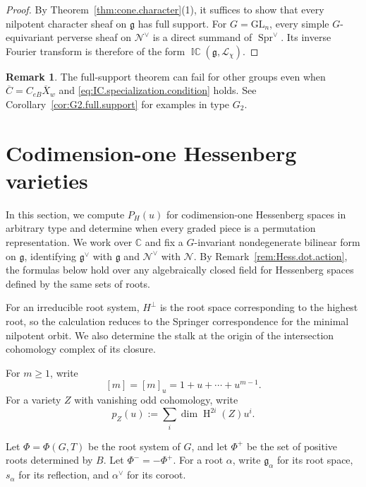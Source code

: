 \documentclass[11pt]{amsart}
\numberwithin{equation}{section}
\theoremstyle{definition}
\newtheorem{remark}[theorem]{Remark}
\DeclareMathOperator{\coh}{\mathrm{H}}
\DeclareMathOperator{\ICperv}{\mathbb{IC}}
\def\C{\mathbb{C}}
\def\fg{\mathfrak {g}}
\DeclareMathOperator{\Spr}{\mathrm{Spr}}
\begin{document}
\begin{proof}
By Theorem~\ref{thm:cone.character}(1), it suffices to show that every nilpotent character sheaf on $\fg$ has full support.
For $G=\mathrm{GL}_n$, every simple $G$-equivariant perverse sheaf on $\mathcal N^\vee$ is a direct summand of $\Spr^\vee$.
Its inverse Fourier transform is therefore of the form $\ICperv(\fg,\mathcal L_\chi)$.
\end{proof}

\begin{remark}
	The full-support theorem can fail for other groups even when $\overline C=C_{eB}\overline X_w$ and \eqref{eq:IC.specialization.condition} holds.
See Corollary~\ref{cor:G2.full.support} for examples in type $G_2$.
\end{remark}















\section{Codimension-one Hessenberg varieties}
\label{s:applications}\label{s:codim1}

In this section, we compute $P_H(u)$ for codimension-one Hessenberg spaces in arbitrary type and determine when every graded piece is a permutation representation.
We work over $\C$ and fix a $G$-invariant nondegenerate bilinear form on $\fg$, identifying $\fg^\vee$ with $\fg$ and $\mathcal N^\vee$ with $\mathcal N$.
By Remark~\ref{rem:Hess.dot.action}, the formulas below hold over any algebraically closed field for Hessenberg spaces defined by the same sets of roots.

For an irreducible root system, $H^\perp$ is the root space corresponding to the highest root, so the calculation reduces to the Springer correspondence for the minimal nilpotent orbit.
We also determine the stalk at the origin of the intersection cohomology complex of its closure.

For $m\geq1$, write 
\[[m]=[m]_u=1+u+\cdots+u^{m-1}.\]
For a variety $Z$ with vanishing odd cohomology, write
\[p_Z(u):=\sum_i\dim \coh^{2i}(Z)u^i.\]



Let $\Phi=\Phi(G,T)$ be the root system of $G$, and let $\Phi^+$ be the set of positive roots determined by $B$. 
Let $\Phi^-=-\Phi^+$.
For a root $\alpha$, write $\mathfrak g_\alpha$ for its root space, $s_\alpha$ for its reflection, and $\alpha^\vee$ for its coroot.
\end{document}
